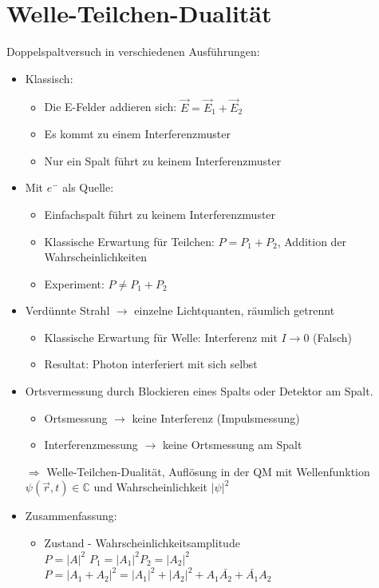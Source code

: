 				\section{Welle-Teilchen-Dualität}
					Doppelspaltversuch in verschiedenen Ausführungen:
					\begin{itemize}
						\item Klassisch: 
						\begin{itemize}
							\item Die E-Felder addieren sich: $ \vec{E} = \vec{E}_1 + \vec{E}_2 $
							\item Es kommt zu einem Interferenzmuster
							\item Nur ein Spalt führt zu keinem Interferenzmuster
						\end{itemize}
						\item Mit $ e^- $ als Quelle:
						\begin{itemize}
							\item Einfachspalt führt zu keinem Interferenzmuster
							\item Klassische Erwartung für Teilchen: $ P = P_1 + P_2$, Addition der Wahrscheinlichkeiten
							\item Experiment: $ P \neq P_1 + P_2  $
						\end{itemize}
						\item Verdünnte Strahl $ \rightarrow $ einzelne Lichtquanten, räumlich getrennt
						\begin{itemize}
							\item Klassische Erwartung für Welle: Interferenz mit $ I \rightarrow 0 $ (Falsch)
							\item Resultat: Photon interferiert mit sich selbst
						\end{itemize}
						\item Ortsvermessung durch Blockieren eines Spalts oder Detektor am Spalt.
						\begin{itemize}
							\item Ortsmessung $ \rightarrow $ keine Interferenz (Impulsmessung)
							\item Interferenzmessung $ \rightarrow $ keine Ortsmessung am Spalt
						\end{itemize}
						$ \Longrightarrow $ Welle-Teilchen-Dualität, Auflösung in der QM mit Wellenfunktion $ \psi(\vec{r}, t) \in \mathbb{C} $ und Wahrscheinlichkeit $ | \psi |^2 $
						\item Zusammenfassung: 
						\begin{itemize}
							\item Zustand - Wahrscheinlichkeitsamplitude\\ $ P = |A|^2 $ $ P_1=|A_1|^2  P_2=|A_2|^2 $\\ $P = |A_1 + A_2|^2 = |A_1|^2 + |A_2|^2 + A_1\bar{A_2} + \bar{A_1}A_2$

\end{itemize}
\end{itemize}
